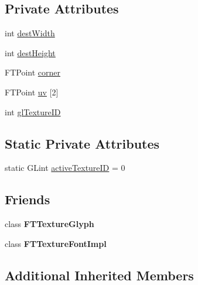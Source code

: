 \subsection*{Private Attributes}
\begin{DoxyCompactItemize}
\item 
int \hyperlink{class_f_t_texture_glyph_impl_a374ab973a59c0d2615bfa77a2756499e}{dest\+Width}
\item 
int \hyperlink{class_f_t_texture_glyph_impl_ae8112e653f244706c95112d52ea1ce17}{dest\+Height}
\item 
F\+T\+Point \hyperlink{class_f_t_texture_glyph_impl_a583e049f6d1714438419e7971d4f9250}{corner}
\item 
F\+T\+Point \hyperlink{class_f_t_texture_glyph_impl_ad408b56e50fb32f4e0d83434271a1543}{uv} \mbox{[}2\mbox{]}
\item 
int \hyperlink{class_f_t_texture_glyph_impl_a9e7c90deafd55bb19afc9027080c0b29}{gl\+Texture\+ID}
\end{DoxyCompactItemize}
\subsection*{Static Private Attributes}
\begin{DoxyCompactItemize}
\item 
static G\+Lint \hyperlink{class_f_t_texture_glyph_impl_a3e5516cf1f53a14eb706bb3c7488f681}{active\+Texture\+ID} = 0
\end{DoxyCompactItemize}
\subsection*{Friends}
\begin{DoxyCompactItemize}
\item 
class {\bfseries F\+T\+Texture\+Glyph}\hypertarget{class_f_t_texture_glyph_impl_a01c2ee1e01ccd33e4f1f26f2478a74a0}{}\label{class_f_t_texture_glyph_impl_a01c2ee1e01ccd33e4f1f26f2478a74a0}

\item 
class {\bfseries F\+T\+Texture\+Font\+Impl}\hypertarget{class_f_t_texture_glyph_impl_a566181ddfc0f1c50d2ff9fd4160a0ff5}{}\label{class_f_t_texture_glyph_impl_a566181ddfc0f1c50d2ff9fd4160a0ff5}

\end{DoxyCompactItemize}
\subsection*{Additional Inherited Members}


